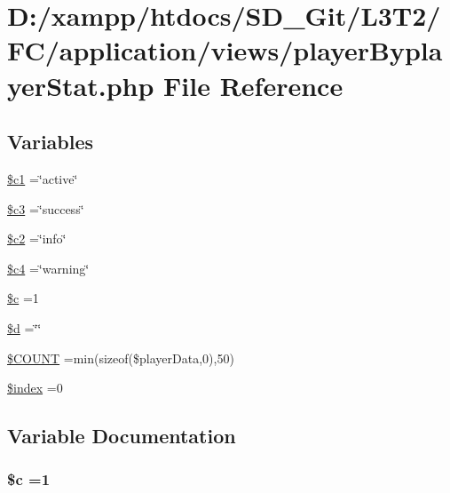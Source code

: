 \hypertarget{player_byplayer_stat_8php}{}\section{D\+:/xampp/htdocs/\+S\+D\+\_\+\+Git/\+L3\+T2/\+F\+C/application/views/player\+Byplayer\+Stat.php File Reference}
\label{player_byplayer_stat_8php}
\subsection*{Variables}
\begin{DoxyCompactItemize}
\item 
\hyperlink{player_byplayer_stat_8php_ae8c2f379ac8fb393e500f127ae317cf0}{\$c1} =\char`\"{}active\char`\"{}
\item 
\hyperlink{player_byplayer_stat_8php_a78a28e488f33dbd56e562b07dc3862e3}{\$c3} =\char`\"{}success\char`\"{}
\item 
\hyperlink{player_byplayer_stat_8php_a7d0ce9eb4b126a1a12c7dade4f7ab7ef}{\$c2} =\char`\"{}info\char`\"{}
\item 
\hyperlink{player_byplayer_stat_8php_a480a6698b6eb8bfee885295be554a1e7}{\$c4} =\char`\"{}warning\char`\"{}
\item 
\hyperlink{player_byplayer_stat_8php_ab73d7f4f2dae233dd561e7fdaab3a77b}{\$c} =1
\item 
\hyperlink{player_byplayer_stat_8php_a0cf5dd496d9f5ff1edf00d234771dcfe}{\$d} =\char`\"{}\char`\"{}
\item 
\hyperlink{player_byplayer_stat_8php_a2c72ce2b8a6bae42166f51c759f34d31}{\$\+C\+O\+U\+N\+T} =min(sizeof(\$player\+Data,0),50)
\item 
\hyperlink{player_byplayer_stat_8php_a23e53dfd2b001b81c9946fa05ec90e6f}{\$index} =0
\end{DoxyCompactItemize}


\subsection{Variable Documentation}
\hypertarget{player_byplayer_stat_8php_ab73d7f4f2dae233dd561e7fdaab3a77b}{}
\subsubsection[{\$c}]{\setlength{\rightskip}{0pt plus 5cm}\${\bf c} =1}\label{player_byplayer_stat_8php_ab73d7f4f2dae233dd561e7fdaab3a77b}
\hypertarget{player_byplayer_stat_8php_ae8c2f379ac8fb393e500f127ae317cf0}{}
